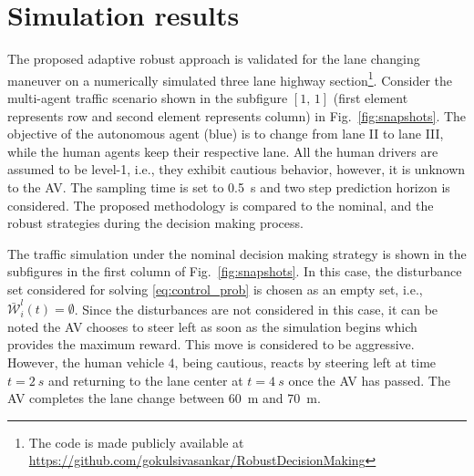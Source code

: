 \documentclass[10pt,journal]{IEEEtran}
\begin{document}
	
	\section{Simulation results}
	\label{sec:sim_results}
	The proposed adaptive robust approach is validated for the lane changing maneuver on a numerically simulated three lane highway section\footnote{The code is made publicly available at \url{https://github.com/gokulsivasankar/RobustDecisionMaking}}. Consider the multi-agent traffic scenario shown in the subfigure $[1,\, 1]$ (first element represents row and second element represents column) in Fig.~\ref{fig:snapshots}. The objective of the autonomous agent (blue) is to change from lane II to lane III, while the human agents keep their respective lane. All the human drivers are assumed to be level-1, i.e., they exhibit cautious behavior, however, it is unknown to the AV. The sampling time is set to \SI{0.5}{s} and two step prediction horizon is considered. The proposed methodology is compared to the nominal, and the robust strategies during the decision making process. 

	The traffic simulation under the nominal decision making strategy is shown in the subfigures in the first column of Fig.~\ref{fig:snapshots}. In this case, the disturbance set considered for solving \eqref{eq:control_prob} is chosen as an empty set, i.e., $\bar{\mathcal{W}}_{i}^{l}(t) = \emptyset$. Since the disturbances are not considered in this case, it can be noted the AV chooses to steer left as soon as the simulation begins which provides the maximum reward. This move is considered to be aggressive. However, the human vehicle $4$, being cautious, reacts by steering left at time $t = \SI{2}{s}$ and returning to the lane center at  $t = \SI{4}{s}$ once the AV has passed. The AV completes the lane change between \SI{60}{m} and \SI{70}{m}. 
\end{document}
